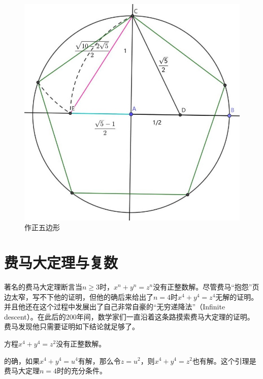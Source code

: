 \documentclass[b5paper]{ctexart}
\begin{document}
\begin{figure}[htbp]
 \centering
 \includegraphics[scale=0.3]{img/pentagon-cons}
 \caption{作正五边形}
 \label{fig:pentagon-cons}
\end{figure}

\section{费马大定理与复数}

著名的费马大定理断言当$n \geq 3$时，$x^n + y^n = z^n$没有正整数解。尽管费马“抱怨”页边太窄，写不下他的证明，但他的确后来给出了$n=4$时$x^4 + y^4 = z^4$无解的证明。并且他还在这个过程中发展出了自己非常自豪的“无穷递降法”（Infinite descent）。在此后的200年间，数学家们一直沿着这条路摸索费马大定理的证明。费马发现他只需要证明如下结论就足够了。

\begin{lemma}
方程$x^4 + y^4 = z^2$没有正整数解。
\end{lemma}

的确，如果$x^4 + y^4 = u^4$有解，那么令$z = u^2$，则$x^4 + y^4 = z^2$也有解。这个引理是费马大定理$n = 4$时的充分条件。
\end{document}
